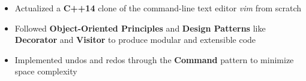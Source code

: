 \documentclass[10pt,a4paper,ragged2e]{altacv}
\begin{document}
\divider
\fi
{}
\begin{itemize}
    \item Actualized a \textbf{C++14} clone of the command-line text editor \emph{vim} from scratch
    \item Followed \textbf{Object-Oriented Principles} and \textbf{Design Patterns} like \textbf{Decorator} and \textbf{Visitor} to produce modular and extensible code
    \item Implemented undos and redos through the \textbf{Command} pattern to minimize space complexity
\end{itemize}
\end{document}
